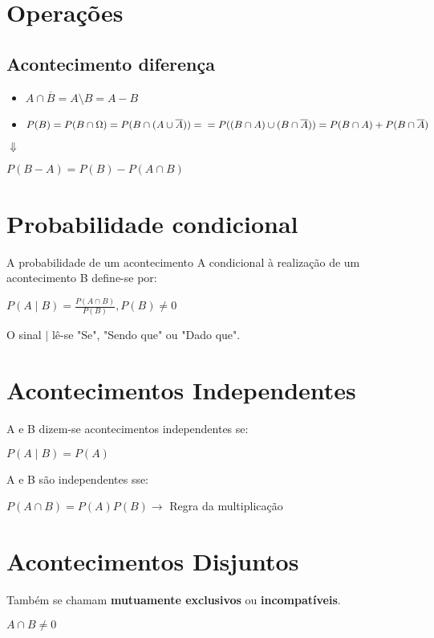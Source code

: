 \section{Operações}

\subsection{Acontecimento diferença}
\begin{itemize}
    \item $A \cap \overline{B} = A \setminus B = A - B$
    \item $P(B) = P(B \cap \Omega) = P(B \cap (A \cup \overline{A})) =\\= P((B \cap A) \cup (B \cap \overline{A})) = P(B \cap A) + P(B \cap \overline{A})$
\end{itemize}
\begin{center}
    $\Downarrow$
\end{center}
\begin{center}
    $P(B-A) = P(B) - P(A \cap B)$
\end{center}

\section{Probabilidade condicional}
A probabilidade de um acontecimento A condicional à realização de um acontecimento B define-se por:
\begin{center}
    $P(A \mid B) = \frac{P(A \cap B)}{P(B)}, P(B) \neq 0$
\end{center}
O sinal $\mid$ lê-se "Se", "Sendo que" ou "Dado que".

\section{Acontecimentos Independentes}
A e B dizem-se acontecimentos independentes se:
\begin{center}
    $P(A \mid B) = P(A)$
\end{center}
A e B são independentes sse:
\begin{center}
    $P(A \cap B) = P(A) P(B) \longrightarrow$ Regra da multiplicação
\end{center}

\section{Acontecimentos Disjuntos}
Também se chamam \textbf{mutuamente exclusivos} ou \textbf{incompatíveis}.
\begin{center}
    $A \cap B \neq 0$
\end{center}
